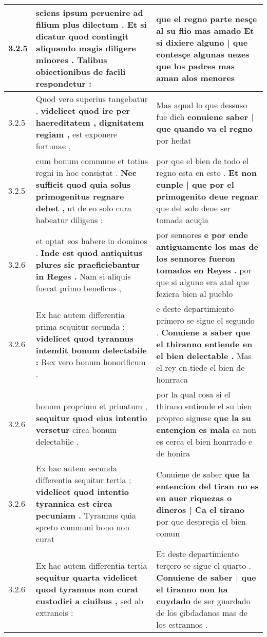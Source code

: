 \begin{tabular}{|p{1cm}|p{6.5cm}|p{6.5cm}|}
3.2.5 & sciens ipsum peruenire ad filium plus dilectum . \textbf{ Et si dicatur quod contingit aliquando magis diligere minores . } Talibus obiectionibus de facili respondetur : & que el regno parte nesçe al su fiio mas amado \textbf{ Et si dixiere alguno | que contesçe algunas uezes } que los padres mas aman alos menores \\\hline
3.2.5 & Quod vero superius tangebatur , \textbf{ videlicet quod ire per haereditatem , dignitatem regiam , } est exponere fortunae , & Mas aqual lo que dessuso fue dich \textbf{ conuiene saber | que quando va el regno } por hedat \\\hline
3.2.5 & cum bonum commune et totius regni in hoc consistat . \textbf{ Nec sufficit quod quia solus primogenitus regnare debet , } ut de eo solo cura habeatur diligens : & por que el bien de todo el regno esta en esto . \textbf{ Et non cunple | que por el primogenito deue regnar } que del solo deue ser tomada acuçia \\\hline
3.2.6 & et optat eos habere in dominos . \textbf{ Inde est quod antiquitus plures sic praeficiebantur in Reges . } Nam si aliquis fuerat primo beneficus , & por sennores \textbf{ e por ende antiguamente los mas de los sennores fueron tomados en Reyes . } por que si alguno era atal que feziera bien al pueblo \\\hline
3.2.6 & Ex hac autem differentia prima sequitur secunda : \textbf{ videlicet quod tyrannus intendit bonum delectabile : } Rex vero bonum honorificum . & e deste departimiento primero se sigue el segundo . \textbf{ Conuiene a saber que el thiranno entiende en el bien delectable . } Mas el rey en tiede el bien de honrraca \\\hline
3.2.6 & bonum proprium et priuatum , \textbf{ sequitur quod eius intentio versetur } circa bonum delectabile . & por la qual cosa si el thirano entiende el su bien propreo siguese \textbf{ que la su entençion es mala } ca non es cerca el bien honrrado e de honira \\\hline
3.2.6 & Ex hac autem secunda differentia sequitur tertia ; \textbf{ videlicet quod intentio tyrannica est circa pecuniam . } Tyrannus quia spreto communi bono non curat & Conuiene de saber \textbf{ que la entencion del tiran no es en auer riquezas o dineros | Ca el tirano } por que despreçia el bien comun \\\hline
3.2.6 & Ex hac autem differentia tertia \textbf{ sequitur quarta videlicet quod tyrannus non curat custodiri a ciuibus , } sed ab extraneis : & Et deste departimiento terçero se sigue el quarto . \textbf{ Conuiene de saber | que el tiranno non ha cuydado } de ser guardado de los çibdadanos mas de los estrannos . \\\hline

\end{tabular}
